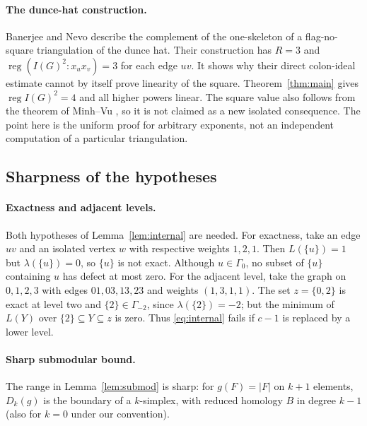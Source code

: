\documentclass[11pt,a4paper]{article}
\theoremstyle{definition}
\newcommand{\reg}{\operatorname{reg}}
\newcommand{\G}{\Gamma}
\begin{document}
\paragraph{The dunce-hat construction.}
Banerjee and Nevo \cite[Section 4]{BN} describe the complement of the one-skeleton of a flag-no-square triangulation of the dunce hat. Their construction has $R=3$ and $\reg(I(G)^2:x_ux_v)=3$ for each edge $uv$. It shows why their direct colon-ideal estimate cannot by itself prove linearity of the square. Theorem~\ref{thm:main} gives $\reg I(G)^2=4$ and all higher powers linear. The square value also follows from the theorem of Minh--Vu \cite{MV}, so it is not claimed as a new isolated consequence. The point here is the uniform proof for arbitrary exponents, not an independent computation of a particular triangulation.

\subsection{Sharpness of the hypotheses}\label{subsec:sharpness}

\paragraph{Exactness and adjacent levels.}
Both hypotheses of Lemma~\ref{lem:internal} are needed. For exactness, take an edge $uv$ and an isolated vertex $w$ with respective weights $1,2,1$. Then $L(\{u\})=1$ but $\lambda(\{u\})=0$, so $\{u\}$ is not exact. Although $u\in\G_0$, no subset of $\{u\}$ containing $u$ has defect at most zero. For the adjacent level, take the graph on $0,1,2,3$ with edges $01,03,13,23$ and weights $(1,3,1,1)$. The set $z=\{0,2\}$ is exact at level two and $\{2\}\in\G_{-2}$, since $\lambda(\{2\})=-2$; but the minimum of $L(Y)$ over $\{2\}\subseteq Y\subseteq z$ is zero. Thus \eqref{eq:internal} fails if $c-1$ is replaced by a lower level.

\paragraph{Sharp submodular bound.}
The range in Lemma~\ref{lem:submod} is sharp: for $g(F)=|F|$ on $k+1$ elements, $D_k(g)$ is the boundary of a $k$-simplex, with reduced homology $B$ in degree $k-1$ (also for $k=0$ under our convention).
\end{document}
